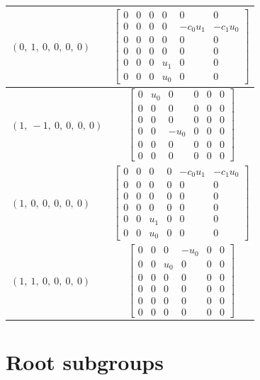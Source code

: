 \documentclass[11pt]{article}
\theoremstyle{definition}
\begin{document}
\begin{longtable}{|l|c|}
    \hline
    $\left( 0, \  1, \  0, \  0, \  0, \  0\right)$ & ${\left[\begin{matrix}0 & 0 & 0 & 0 & 0 & 0\\0 & 0 & 0 & 0 & - c_{0} u_{1} & - c_{1} u_{0}\\0 & 0 & 0 & 0 & 0 & 0\\0 & 0 & 0 & 0 & 0 & 0\\0 & 0 & 0 & u_{1} & 0 & 0\\0 & 0 & 0 & u_{0} & 0 & 0\end{matrix}\right]}$ \\
    \hline
    $\left( 1, \  -1, \  0, \  0, \  0, \  0\right)$ & ${\left[\begin{matrix}0 & u_{0} & 0 & 0 & 0 & 0\\0 & 0 & 0 & 0 & 0 & 0\\0 & 0 & 0 & 0 & 0 & 0\\0 & 0 & - u_{0} & 0 & 0 & 0\\0 & 0 & 0 & 0 & 0 & 0\\0 & 0 & 0 & 0 & 0 & 0\end{matrix}\right]}$ \\
    \hline
    $\left( 1, \  0, \  0, \  0, \  0, \  0\right)$ & ${\left[\begin{matrix}0 & 0 & 0 & 0 & - c_{0} u_{1} & - c_{1} u_{0}\\0 & 0 & 0 & 0 & 0 & 0\\0 & 0 & 0 & 0 & 0 & 0\\0 & 0 & 0 & 0 & 0 & 0\\0 & 0 & u_{1} & 0 & 0 & 0\\0 & 0 & u_{0} & 0 & 0 & 0\end{matrix}\right]}$ \\
    \hline
    $\left( 1, \  1, \  0, \  0, \  0, \  0\right)$ & ${\left[\begin{matrix}0 & 0 & 0 & - u_{0} & 0 & 0\\0 & 0 & u_{0} & 0 & 0 & 0\\0 & 0 & 0 & 0 & 0 & 0\\0 & 0 & 0 & 0 & 0 & 0\\0 & 0 & 0 & 0 & 0 & 0\\0 & 0 & 0 & 0 & 0 & 0\end{matrix}\right]}$ \\
    \hline
\end{longtable}


\newpage
\section{Root subgroups}
\end{document}
